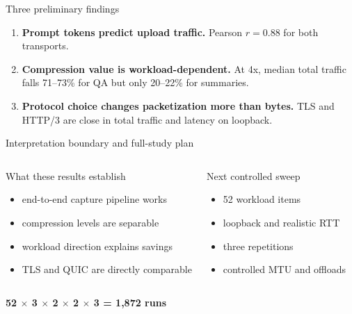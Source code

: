 \documentclass[aspectratio=169,10pt]{beamer}
\begin{document}
\begin{frame}{Three preliminary findings}
  \vspace{0.2cm}
  \begin{enumerate}
    \item[\color{AIBlue}\bfseries 01]\quad
      \textbf{Prompt tokens predict upload traffic.}
      Pearson $r=0.88$ for both transports.
    \vspace{0.35cm}
    \item[\color{AIOrange}\bfseries 02]\quad
      \textbf{Compression value is workload-dependent.}
      At 4x, median total traffic falls 71--73\% for QA but only 20--22\% for summaries.
    \vspace{0.35cm}
    \item[\color{AIGreen}\bfseries 03]\quad
      \textbf{Protocol choice changes packetization more than bytes.}
      TLS and HTTP/3 are close in total traffic and latency on loopback.
  \end{enumerate}
\end{frame}

\begin{frame}{Interpretation boundary and full-study plan}
  \begin{columns}[T,onlytextwidth]
      \begin{block}{What these results establish}
        \begin{itemize}
          \item end-to-end capture pipeline works
          \item compression levels are separable
          \item workload direction explains savings
          \item TLS and QUIC are directly comparable
        \end{itemize}
      \end{block}
      \begin{block}{Next controlled sweep}
        \begin{itemize}
          \item 52 workload items
          \item loopback and realistic RTT
          \item three repetitions
          \item controlled MTU and offloads
        \end{itemize}
      \end{block}
  \end{columns}
  \vspace{0.35cm}
  \centering
  {\Large\bfseries 52 $\times$ 3 $\times$ 2 $\times$ 2 $\times$ 3
   = \color{AIBlue}1,872 runs}
\end{frame}
\end{document}
